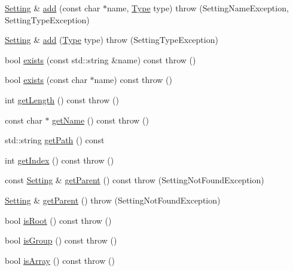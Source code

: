 \begin{DoxyCompactItemize}
\item 
\hyperlink{classlibconfig_1_1Setting}{Setting} \& \hyperlink{classlibconfig_1_1Setting_a3b3ad21872906e8533c711cfc73b50dd}{add} (const char $\ast$name, \hyperlink{classlibconfig_1_1Setting_a42f760ff88654e784477a6f040267bb4}{Type} type)  throw (\-Setting\-Name\-Exception, Setting\-Type\-Exception)
\item 
\hyperlink{classlibconfig_1_1Setting}{Setting} \& \hyperlink{classlibconfig_1_1Setting_a32fdd08f5b3d856f7d706867fa8d7074}{add} (\hyperlink{classlibconfig_1_1Setting_a42f760ff88654e784477a6f040267bb4}{Type} type)  throw (\-Setting\-Type\-Exception)
\item 
bool \hyperlink{classlibconfig_1_1Setting_a1bf8273fc34c8d965b4c110815c5dda3}{exists} (const std\-::string \&name) const   throw ()
\item 
bool \hyperlink{classlibconfig_1_1Setting_a1f5a2e3b389c28c18f8e0b21948480f5}{exists} (const char $\ast$name) const   throw ()
\item 
int \hyperlink{classlibconfig_1_1Setting_a150d10fa07afab2e5e65ac5fa1c40f40}{get\-Length} () const   throw ()
\item 
const char $\ast$ \hyperlink{classlibconfig_1_1Setting_a2b5310a3a8b784c76f2d838b3861527c}{get\-Name} () const   throw ()
\item 
std\-::string \hyperlink{classlibconfig_1_1Setting_a7646f4ee12327170117a35fc248beff8}{get\-Path} () const 
\item 
int \hyperlink{classlibconfig_1_1Setting_a80146d2ef242ec06fb4766b375c0cd1c}{get\-Index} () const   throw ()
\item 
const \hyperlink{classlibconfig_1_1Setting}{Setting} \& \hyperlink{classlibconfig_1_1Setting_a5dbfe99711fd915483fd318695a6b42c}{get\-Parent} () const   throw (\-Setting\-Not\-Found\-Exception)
\item 
\hyperlink{classlibconfig_1_1Setting}{Setting} \& \hyperlink{classlibconfig_1_1Setting_afe7957eeaed5e8f20cb6d08edfda3aac}{get\-Parent} ()  throw (\-Setting\-Not\-Found\-Exception)
\item 
bool \hyperlink{classlibconfig_1_1Setting_a6e73e9387d36975436418b8a509f979d}{is\-Root} () const   throw ()
\item 
bool \hyperlink{classlibconfig_1_1Setting_a2104d6bdfb12ea47897c806058c38eee}{is\-Group} () const   throw ()
\item 
bool \hyperlink{classlibconfig_1_1Setting_a412c26d5650317469dbadb5e9c021ca6}{is\-Array} () const   throw ()
\item 

\end{DoxyCompactItemize}
